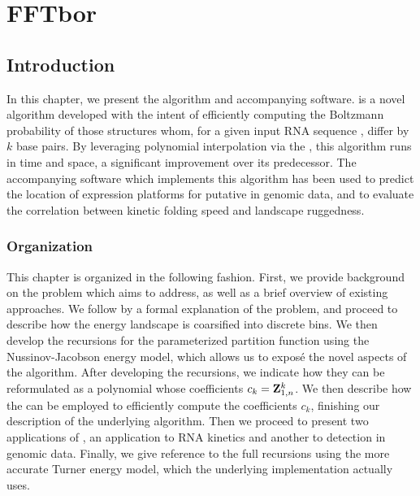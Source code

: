 
\chapter{FFTbor}
\label{ch:fftbor}


\section{Introduction}
\label{sec:fftbor:intro}

In this chapter, we present the \fftbor algorithm and accompanying software.
\fftbor is a novel algorithm developed with the intent of efficiently computing
the Boltzmann probability of those structures whom, for a given input RNA
sequence \seq, differ by $k$ base pairs. By leveraging polynomial interpolation
via the \fft, this algorithm runs in  time and
 space, a significant improvement over its predecessor. The accompanying
software which implements this algorithm has been used to predict the location
of expression platforms for putative \rbs in genomic data, and to
evaluate the correlation between kinetic folding speed and landscape ruggedness.

\subsection{Organization}
\label{subsec:fftbor:org}

This chapter is organized in the following fashion. First, we provide
background on
the problem which \fftbor aims to address, as well as a brief overview of
existing approaches. We follow by a formal explanation of the problem, and
proceed to describe how the energy landscape is coarsified into discrete bins.
We then develop the recursions for the parameterized partition function using
the Nussinov-Jacobson energy model, which allows us to exposé the novel aspects
of the algorithm. After developing the recursions, we indicate how they can be
reformulated as a polynomial whose coefficients $c_k={\bf Z}^{k}_{1,n}$. We then
describe how the \fft can be employed to efficiently compute the coefficients
$c_k$, finishing our description of the underlying algorithm. Then we proceed
to present two applications of \fftbor, an application to RNA kinetics and
another to \rb detection in genomic data. Finally, we give reference
to the full recursions using the more accurate Turner energy model, which the
underlying implementation actually uses.

